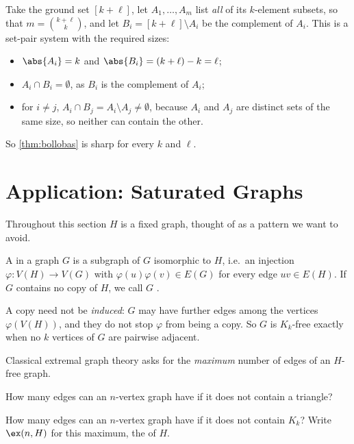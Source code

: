 \begin{remark}\label{rmk:bollobas-sharp}
    Take the ground set \([k+\ell]\), let \(A_1, \ldots, A_m\) list \emph{all} of its \(k\)-element subsets, so that \(m = \binom{k+\ell}{k}\), and let \(B_i = [k+\ell] \setminus A_i\) be the complement of \(A_i\). This is a set-pair system with the required sizes:
    \begin{itemize}
        \item \(\abs{A_i} = k\) and \(\abs{B_i} = (k + \ell) - k = \ell\);
        \item \(A_i \cap B_i = \emptyset\), as \(B_i\) is the complement of \(A_i\);
        \item for \(i \ne j\), \(A_i \cap B_j = A_i \setminus A_j \ne \emptyset\), because \(A_i\) and \(A_j\) are distinct sets of the same size, so neither can contain the other.
    \end{itemize}
    So \autoref{thm:bollobas} is sharp for every \(k\) and \(\ell\).
\end{remark}

\section{Application: Saturated Graphs}\label{sec:saturation}

Throughout this section \(H\) is a fixed graph, thought of as a pattern we want to avoid.

\begin{definition}[\(H\)-free]\label{def:H-free}
    A  in a graph \(G\) is a subgraph of \(G\) isomorphic to \(H\), i.e.\ an injection \(\varphi \colon V(H) \to V(G)\) with \(\varphi(u)\varphi(v) \in E(G)\) for every edge \(uv \in E(H)\). If \(G\) contains no copy of \(H\), we call \(G\) .
\end{definition}

\begin{remark}
    A copy need not be \emph{induced}: \(G\) may have further edges among the vertices \(\varphi(V(H))\), and they do not stop \(\varphi\) from being a copy. So \(G\) is \(K_k\)-free exactly when no \(k\) vertices of \(G\) are pairwise adjacent.
\end{remark}

Classical extremal graph theory asks for the \emph{maximum} number of edges of an \(H\)-free graph.

\begin{question}[Mantel]
    How many edges can an \(n\)-vertex graph have if it does not contain a triangle?
\end{question}
\begin{question}[Tur\'an, 1941]\label{q:turan}
    How many edges can an \(n\)-vertex graph have if it does not contain \(K_k\)? Write \(\ex(n, H)\) for this maximum, the  of \(H\).
\end{question}

